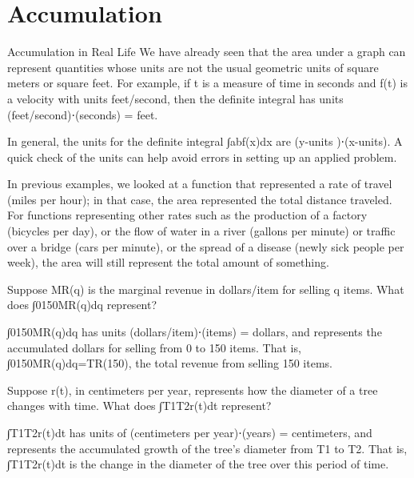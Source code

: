 \section{Accumulation}
\label{sec:accumulation}

Accumulation in Real Life
We have already seen that the area under a graph can represent quantities whose units are not the usual geometric units of square meters or square feet. For example, if t is a measure of time in seconds and f(t) is a velocity with units feet/second, then the definite integral has units (feet/second)⋅(seconds) = feet.

In general, the units for the definite integral ∫abf(x)dx are (y-units )⋅(x-units). A quick check of the units can help avoid errors in setting up an applied problem.

In previous examples, we looked at a function that represented a rate of travel (miles per hour); in that case, the area represented the total distance traveled. For functions representing other rates such as the production of a factory (bicycles per day), or the flow of water in a river (gallons per minute) or traffic over a bridge (cars per minute), or the spread of a disease (newly sick people per week), the area will still represent the total amount of something.

\begin{example}
Suppose MR(q) is the marginal revenue in dollars/item for selling q items. What does ∫0150MR(q)dq represent?

\begin{solution}
  ∫0150MR(q)dq has units (dollars/item)⋅(items) = dollars, and represents the accumulated dollars for selling from 0 to 150 items. That is, ∫0150MR(q)dq=TR(150), the total revenue from selling 150 items.
\end{solution}\end{example}

\begin{example}
Suppose r(t), in centimeters per year, represents how the diameter of a tree changes with time. What does ∫T1T2r(t)dt represent?

\begin{solution}
  ∫T1T2r(t)dt has units of (centimeters per year)⋅(years) = centimeters, and represents the accumulated growth of the tree’s diameter from T1 to T2. That is, ∫T1T2r(t)dt is the change in the diameter of the tree over this period of time.
\end{solution}\end{example}
